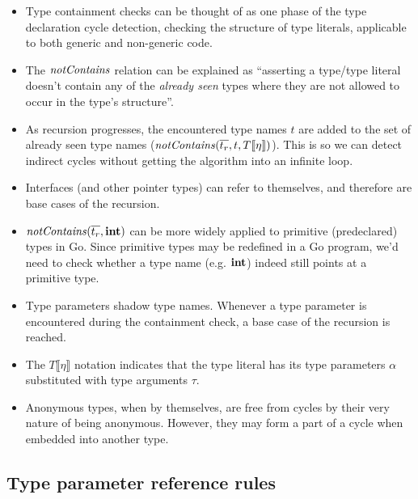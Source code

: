 \documentclass[12pt]{article}
\begin{document}
\begin{itemize}
    \item Type containment checks can be thought of as one phase of the type
          declaration cycle detection, checking the structure of type literals,
          applicable to both generic and non-generic code.

    \item The $\mathit{notContains}$ relation can be explained as ``asserting a type/type
          literal doesn't contain any of the \emph{already seen} types where they are
          not allowed to occur in the type's structure''.

    \item As recursion progresses, the encountered type names $t$ are added to
          the set of already seen type names ($\mathit{notContains}(\overline{t_r}, t, T
              \llbracket\eta\rrbracket)$). This is so we can detect indirect cycles
          without getting the algorithm into an infinite loop.

    \item Interfaces (and other pointer types) can refer to themselves, and
          therefore are base cases of the recursion.

    \item $\mathit{notContains}(\overline{t_r}, \texttt{\bf int})$ can be more widely applied to primitive
          (predeclared) types in Go. Since primitive types may be redefined in a Go
          program, we'd need to check whether a type name (e.g. $\texttt{\bf int}$) indeed
          still points at a primitive type.

    \item Type parameters shadow type names. Whenever a type parameter is
          encountered during the containment check, a base case of the recursion is
          reached.

    \item The $T \llbracket\eta\rrbracket$ notation indicates that the type
          literal has its type parameters $\alpha$ substituted with type arguments
          $\tau$.

    \item Anonymous types, when by themselves, are free from cycles by their
          very nature of being anonymous. However, they may form a part of a
          cycle when embedded into another type.
\end{itemize}

\subsection{Type parameter reference rules}
\end{document}
